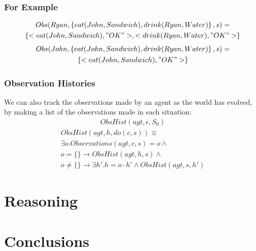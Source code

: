 \documentclass{beamer}
\begin{document}
\begin{frame}
\frametitle{For Example}
\begin{multline*}
  Obs(Ryan,\left\{eat(John,Sandwich),drink(Ryan,Water)\right\},s) = \\
     \left\{<eat(John,Sandwich),"OK">,<drink(Ryan,Water),"OK">\right\}
\end{multline*}
\pause
\begin{multline*}
  Obs(John,\left\{eat(John,Sandwich),drink(Ryan,Water)\right\},s) = \\
     \left\{<eat(John,Sandwich),"OK">\right\}
\end{multline*}
\end{frame}

\begin{frame}
\frametitle{Observation Histories}
We can also track the observations made by an agent as the world has evolved,
by making a list of the observations made in each situation:
\begin{multline*}
ObsHist(agt,\epsilon,S_0)
\end{multline*}
\begin{multline*}
ObsHist(agt,h,do(c,s)) \equiv \\
    \exists o . Observations(agt,c,s) = o \wedge \\
    o = \{\} \rightarrow ObsHist(agt,h,s) \wedge \\
    o \not = \{\} \rightarrow \exists h' . h=o\cdot h' \wedge ObsHist(agt,s,h')
\end{multline*}
\end{frame}

\section{Reasoning}

\section{Conclusions}
\end{document}
